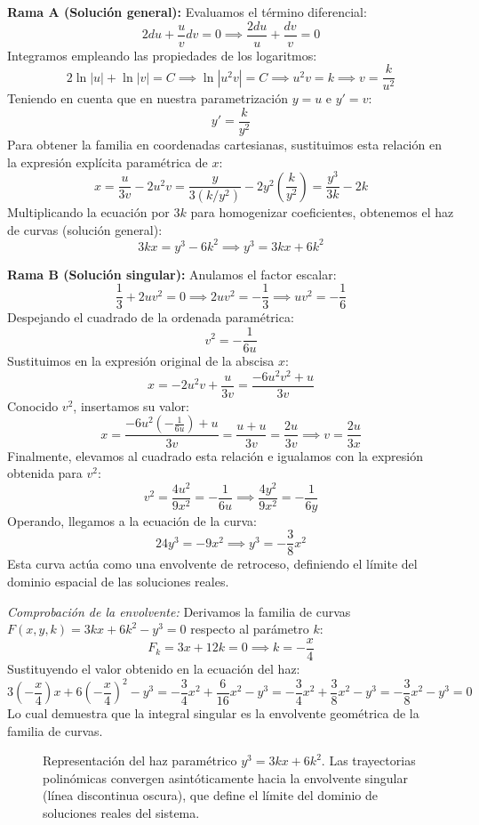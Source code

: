 \begin{tcolorbox}
\textbf{Rama A (Solución general):} Evaluamos el término diferencial:
$$ 2 du + \frac{u}{v} dv = 0 \implies \frac{2 du}{u} + \frac{dv}{v} = 0 $$
Integramos empleando las propiedades de los logaritmos:
$$ 2\ln|u| + \ln|v| = C \implies \ln|u^2 v| = C \implies u^2 v = k \implies v = \frac{k}{u^2} $$
Teniendo en cuenta que en nuestra parametrización $y = u$ e $y' = v$:
$$ y' = \frac{k}{y^2} $$
Para obtener la familia en coordenadas cartesianas, sustituimos esta relación en la expresión explícita paramétrica de $x$:
$$ x = \frac{u}{3v} - 2u^2 v = \frac{y}{3(k/y^2)} - 2y^2\left(\frac{k}{y^2}\right) = \frac{y^3}{3k} - 2k $$
Multiplicando la ecuación por $3k$ para homogenizar coeficientes, obtenemos el haz de curvas (solución general):
$$ 3kx = y^3 - 6k^2 \implies \boxed{y^3 = 3kx + 6k^2} $$

\textbf{Rama B (Solución singular):} Anulamos el factor escalar:
$$ \frac{1}{3} + 2uv^2 = 0 \implies 2uv^2 = -\frac{1}{3} \implies uv^2 = -\frac{1}{6} $$
Despejando el cuadrado de la ordenada paramétrica:
$$ v^2 = -\frac{1}{6u} $$
Sustituimos en la expresión original de la abscisa $x$:
$$ x = -2u^2 v + \frac{u}{3v} = \frac{-6u^2 v^2 + u}{3v} $$
Conocido $v^2$, insertamos su valor:
$$ x = \frac{-6u^2\left(-\frac{1}{6u}\right) + u}{3v} = \frac{u + u}{3v} = \frac{2u}{3v} \implies v = \frac{2u}{3x} $$
Finalmente, elevamos al cuadrado esta relación e igualamos con la expresión obtenida para $v^2$:
$$ v^2 = \frac{4u^2}{9x^2} = -\frac{1}{6u} \implies \frac{4y^2}{9x^2} = -\frac{1}{6y} $$
Operando, llegamos a la ecuación de la curva:
$$ 24y^3 = -9x^2 \implies \boxed{y^3 = -\frac{3}{8}x^2} $$
Esta curva actúa como una envolvente de retroceso, definiendo el límite del dominio espacial de las soluciones reales.

\textit{Comprobación de la envolvente:} Derivamos la familia de curvas $F(x,y,k) = 3kx + 6k^2 - y^3 = 0$ respecto al parámetro $k$:
$$ F_k = 3x + 12k = 0 \implies k = -\frac{x}{4} $$
Sustituyendo el valor obtenido en la ecuación del haz:
$$ 3\left(-\frac{x}{4}\right)x + 6\left(-\frac{x}{4}\right)^2 - y^3 = -\frac{3}{4}x^2 + \frac{6}{16}x^2 - y^3 = -\frac{3}{4}x^2 + \frac{3}{8}x^2 - y^3 = -\frac{3}{8}x^2 - y^3 = 0 $$
Lo cual demuestra que la integral singular es la envolvente geométrica de la familia de curvas.

\begin{figure}[H]
    \centering
    
    \caption{Representación del haz paramétrico $y^3 = 3kx + 6k^2$. Las trayectorias polinómicas convergen asintóticamente hacia la envolvente singular (línea discontinua oscura), que define el límite del dominio de soluciones reales del sistema.}
\end{figure}
\end{tcolorbox}


